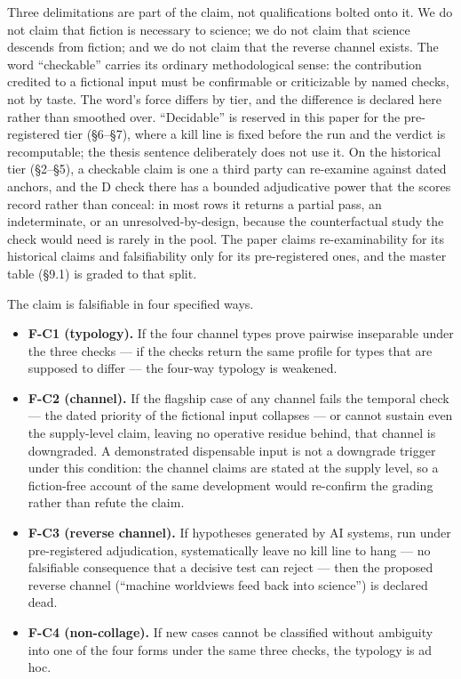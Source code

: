 \documentclass[11pt,a4paper]{article}
\begin{document}
Three delimitations are part of the claim, not qualifications bolted onto it. We do not claim that fiction is necessary to science; we do not claim that science descends from fiction; and we do not claim that the reverse channel exists. The word ``checkable'' carries its ordinary methodological sense: the contribution credited to a fictional input must be confirmable or criticizable by named checks, not by taste. The word's force differs by tier, and the difference is declared here rather than smoothed over. ``Decidable'' is reserved in this paper for the pre-registered tier (§6–§7), where a kill line is fixed before the run and the verdict is recomputable; the thesis sentence deliberately does not use it. On the historical tier (§2–§5), a checkable claim is one a third party can re-examine against dated anchors, and the D check there has a bounded adjudicative power that the scores record rather than conceal: in most rows it returns a partial pass, an indeterminate, or an unresolved-by-design, because the counterfactual study the check would need is rarely in the pool. The paper claims re-examinability for its historical claims and falsifiability only for its pre-registered ones, and the master table (§9.1) is graded to that split.

The claim is falsifiable in four specified ways.

\begin{itemize}[leftmargin=1.6em,itemsep=2pt,parsep=0pt,topsep=3pt]
\item \textbf{F-C1 (typology).} If the four channel types prove pairwise inseparable under the three checks — if the checks return the same profile for types that are supposed to differ — the four-way typology is weakened.
\item \textbf{F-C2 (channel).} If the flagship case of any channel fails the temporal check — the dated priority of the fictional input collapses — or cannot sustain even the supply-level claim, leaving no operative residue behind, that channel is downgraded. A demonstrated dispensable input is not a downgrade trigger under this condition: the channel claims are stated at the supply level, so a fiction-free account of the same development would re-confirm the grading rather than refute the claim.
\item \textbf{F-C3 (reverse channel).} If hypotheses generated by AI systems, run under pre-registered adjudication, systematically leave no kill line to hang — no falsifiable consequence that a decisive test can reject — then the proposed reverse channel (``machine worldviews feed back into science'') is declared dead.
\item \textbf{F-C4 (non-collage).} If new cases cannot be classified without ambiguity into one of the four forms under the same three checks, the typology is ad hoc.
\end{itemize}
\end{document}
